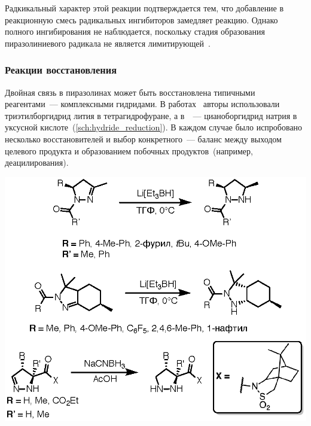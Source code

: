 Радкикальный характер этой реакции подтверждается тем, что добавление в реакционную смесь радикальных ингибиторов замедляет реакцию.
Однако полного ингибирования не наблюдается, поскольку стадия образования пиразолиниевого радикала не является лимитирующей~\cite{Traven2016}.



\subsubsection{Реакции восстановления}
Двойная связь  в пиразолинах может быть восстановлена типичными реагентами~--- комплексными гидридами. В работах~\cite{Jakob2010, DeLosSantos2008a} авторы использовали триэтилборгидрид лития в тетрагидрофуране, а в~\cite{Mish1997a}~--- цианоборгидрид натрия в уксусной кислоте~(\ref{sch:hydride_reduction}).
В каждом случае было испробовано несколько восстановителей и выбор конкретного~--- баланс между выходом целевого продукта и образованием побочных продуктов~(например, деацилирования).

\begin{scheme}[h!]
    \centering
    \includegraphics{sections/literature/img/hydride_reduction.eps}
    \caption{}
    \label{sch:hydride_reduction}
\end{scheme}

